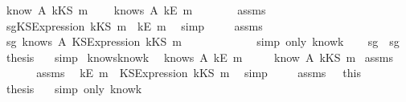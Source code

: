 \begin{isabellebody}
\ {\isachardoublequoteopen}know\ A\ {\isacharparenleft}kKS\ m{\isacharparenright}{\isachardoublequoteclose}\isanewline
{}\ \ \ \ {\isachardoublequoteopen}knows\ A\ {\isacharbrackleft}kE\ m{\isacharbrackright}{\isachardoublequoteclose}\ \isanewline
%
\isadelimproof
%
\endisadelimproof
%
\isatagproof
{}\isamarkupfalse%
\ {\isacharminus}\ \isanewline
\ \ \isamarkupfalse%
\ assms\ \isamarkupfalse%
\ sg{}{\isacharcolon}{\isachardoublequoteopen}KS{}Expression\ {\isacharparenleft}kKS\ m{\isacharparenright}\ {\isacharequal}\ kE\ m{\isachardoublequoteclose}\ \isamarkupfalse%
\ simp\ \isanewline
\ \ \isamarkupfalse%
\ assms\ \isamarkupfalse%
\ sg{}{\isacharcolon}\ {\isachardoublequoteopen}knows\ A\ {\isacharbrackleft}KS{}Expression\ {\isacharparenleft}kKS\ m{\isacharparenright}{\isacharbrackright}{\isachardoublequoteclose}\ \ \ \ \ \ \isanewline
\ \ \ \ \ \isamarkupfalse%
\ {\isacharparenleft}simp\ only{\isacharcolon}\ know{}k{\isacharparenright}\isanewline
\ \ \isamarkupfalse%
\ sg{}\ \ sg{}\ \isamarkupfalse%
\ {\isacharquery}thesis\ \ \isamarkupfalse%
\ simp\isanewline
{}\isamarkupfalse%
%
\endisatagproof
{\isafoldproof}%
%
\isadelimproof
\isanewline
%
\endisadelimproof
\isanewline
{}\isamarkupfalse%
\ knows{}know{\isacharunderscore}k{\isacharcolon}\ \isanewline
{}\ {\isachardoublequoteopen}knows\ A\ {\isacharbrackleft}kE\ m{\isacharbrackright}{\isachardoublequoteclose}\ \isanewline
{}\ \ \ \ {\isachardoublequoteopen}know\ A\ {\isacharparenleft}kKS\ m{\isacharparenright}{\isachardoublequoteclose}\isanewline
%
\isadelimproof
%
\endisadelimproof
%
\isatagproof
{}\isamarkupfalse%
\ assms\isanewline
{}\isamarkupfalse%
\ {\isacharminus}\ \isanewline
\ \ \isamarkupfalse%
\ assms\ \isamarkupfalse%
\ {\isachardoublequoteopen}kE\ m\ {\isacharequal}\ KS{}Expression\ {\isacharparenleft}kKS\ m{\isacharparenright}{\isachardoublequoteclose}\ \isamarkupfalse%
\ simp\ \isanewline
\ \ \isamarkupfalse%
\ assms\ \ \ this\ \isamarkupfalse%
\ {\isacharquery}thesis\ \ \isamarkupfalse%
\ {\isacharparenleft}simp\ only{\isacharcolon}\ know{}k{\isacharparenright}\isanewline

\end{isabellebody}
